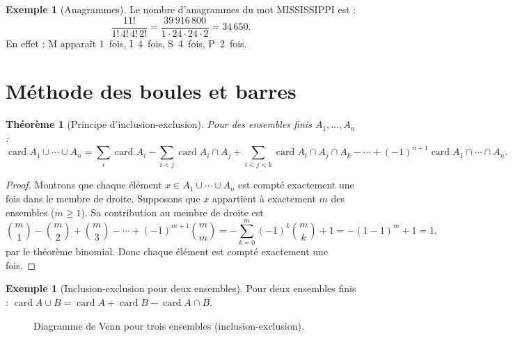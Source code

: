 \documentclass[12pt,a4paper,openany]{book}
\theoremstyle{definition}
\newtheorem{exemple}[definition]{Exemple}
\theoremstyle{plain}
\newtheorem{theoreme}[definition]{Théorème}
\theoremstyle{remark}
\DeclareMathOperator{\card}{card}
\begin{document}
\begin{exemple}[Anagrammes]\label{ex:anagrammes}
Le nombre d'anagrammes du mot \textsc{MISSISSIPPI} est :
\[
  \frac{11!}{1!\, 4!\, 4!\, 2!} = \frac{39\,916\,800}{1 \cdot 24 \cdot 24 \cdot 2}
  = 34\,650.
\]
En effet : M apparaît 1~fois, I~4~fois, S~4~fois, P~2~fois.
\end{exemple}

\section{Méthode des boules et barres}\label{sec:boules-barres}

\begin{theoreme}[Principe d'inclusion-exclusion]\label{thm:inclusion-exclusion}
Pour des ensembles finis $A_1, \ldots, A_n$ :
\[
  \card{A_1 \cup \cdots \cup A_n}
  = \sum_{i}\card{A_i}
  - \sum_{i<j}\card{A_i \cap A_j}
  + \sum_{i<j<k}\card{A_i \cap A_j \cap A_k}
  - \cdots
  + (-1)^{n+1}\card{A_1 \cap \cdots \cap A_n}.
\]
\end{theoreme}

\begin{proof}
Montrons que chaque élément $x \in A_1 \cup \cdots \cup A_n$ est compté
exactement une fois dans le membre de droite. Supposons que $x$ appartient à
exactement $m$ des ensembles ($m \geq 1$). Sa contribution au membre de
droite est
\[
  \binom{m}{1} - \binom{m}{2} + \binom{m}{3} - \cdots + (-1)^{m+1}\binom{m}{m}
  = -\sum_{k=0}^{m}(-1)^k\binom{m}{k} + 1 = -(1-1)^m + 1 = 1,
\]
par le théorème binomial. Donc chaque élément est compté exactement une fois.
\end{proof}

\begin{exemple}[Inclusion-exclusion pour deux ensembles]\label{ex:incl-excl-2}
Pour deux ensembles finis : $\card{A \cup B} = \card{A} + \card{B} - \card{A \cap B}$.
\end{exemple}

\begin{figure}[ht]
\centering
{}
\caption{Diagramme de Venn pour trois ensembles (inclusion-exclusion).}
\label{fig:venn-incl-excl}
\end{figure}
\end{document}
